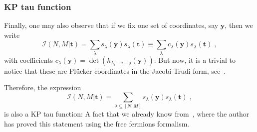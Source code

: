 \documentclass[a4paper,11pt]{amsart}
\begin{document}

\subsubsection{KP tau function}
Finally, one may also observe that if we fix one set of coordinates,
say \(\bm{y}\), then we write
\begin{equation}
 \mathcal{I}(N,M|\bm{t}) 
 = \sum_{\lambda} s_\lambda(\bm{y})  s_\lambda(\bm{t}) 
 \equiv \sum_{\lambda} c_\lambda(\bm{y})  s_\lambda(\bm{t}) \; ,
\end{equation}
with coefficients \(c_\lambda(\bm{y}) = \det (h_{\lambda_i-i +j}(\bm{y}))\).
But now, it is a trivial to notice that these are Plücker
coordinates in the Jacobi-Trudi form, see~\cite{Miwa2000, Alexandrov:2012tr}. 

Therefore, the expression
\begin{equation}
 \mathcal{I}(N,M|\bm{t}) = \sum_{\lambda \subseteq [N,M]} s_\lambda(\bm{y})  s_\lambda(\bm{t}) \; ,
\end{equation}
is also a KP tau function: A fact that we already know
from~\cite{Wheeler:2010vmq}, where the author has proved this
statement using the free fermions formalism.


\end{document}

